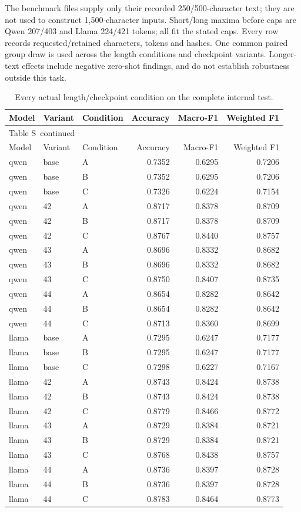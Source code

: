 \documentclass[10pt,a4paper]{article}
\renewcommand{\thetable}{S\arabic{table}}
\begin{document}
The benchmark files supply only their recorded 250/500-character text; they are not used to construct 1,500-character inputs. Short/long maxima before caps are Qwen 207/403 and Llama 224/421 tokens; all fit the stated caps. Every row records requested/retained characters, tokens and hashes. One common paired group draw is used across the length conditions and checkpoint variants. Longer-text effects include negative zero-shot findings, and do not establish robustness outside this task.


{\small
\setlength{\tabcolsep}{4pt}
\begin{longtable}{@{}lllrrr@{}}
\caption{Every actual length/checkpoint condition on the complete internal test.}\label{sup:length-seeds}\\
\toprule
Model & Variant & Condition & Accuracy & Macro-F1 & Weighted F1 \\
\midrule\endfirsthead
\multicolumn{6}{l}{\small Table \thetable\ continued}\\
\toprule
Model & Variant & Condition & Accuracy & Macro-F1 & Weighted F1 \\
\midrule\endhead
\bottomrule\endfoot
qwen & base & A & 0.7352 & 0.6295 & 0.7206 \\
qwen & base & B & 0.7352 & 0.6295 & 0.7206 \\
qwen & base & C & 0.7326 & 0.6224 & 0.7154 \\
qwen & 42 & A & 0.8717 & 0.8378 & 0.8709 \\
qwen & 42 & B & 0.8717 & 0.8378 & 0.8709 \\
qwen & 42 & C & 0.8767 & 0.8440 & 0.8757 \\
qwen & 43 & A & 0.8696 & 0.8332 & 0.8682 \\
qwen & 43 & B & 0.8696 & 0.8332 & 0.8682 \\
qwen & 43 & C & 0.8750 & 0.8407 & 0.8735 \\
qwen & 44 & A & 0.8654 & 0.8282 & 0.8642 \\
qwen & 44 & B & 0.8654 & 0.8282 & 0.8642 \\
qwen & 44 & C & 0.8713 & 0.8360 & 0.8699 \\
llama & base & A & 0.7295 & 0.6247 & 0.7177 \\
llama & base & B & 0.7295 & 0.6247 & 0.7177 \\
llama & base & C & 0.7298 & 0.6227 & 0.7167 \\
llama & 42 & A & 0.8743 & 0.8424 & 0.8738 \\
llama & 42 & B & 0.8743 & 0.8424 & 0.8738 \\
llama & 42 & C & 0.8779 & 0.8466 & 0.8772 \\
llama & 43 & A & 0.8729 & 0.8384 & 0.8721 \\
llama & 43 & B & 0.8729 & 0.8384 & 0.8721 \\
llama & 43 & C & 0.8768 & 0.8438 & 0.8757 \\
llama & 44 & A & 0.8736 & 0.8397 & 0.8728 \\
llama & 44 & B & 0.8736 & 0.8397 & 0.8728 \\
llama & 44 & C & 0.8783 & 0.8464 & 0.8773 \\
\end{longtable}
}
\end{document}
